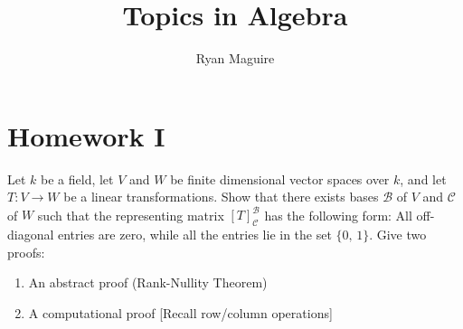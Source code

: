\documentclass[crop=false,class=article]{standalone}                       %
\begin{document}
    \title{Topics in Algebra}
    \author{Ryan Maguire}
    \date{\vspace{-5ex}}
    \maketitle
    \tableofcontents
    \section{Homework I}
        \begin{problem}
            Let $k$ be a field, let $V$ and $W$ be finite dimensional
            vector spaces over $k$, and let $T:V\rightarrow{W}$ be a
            linear transformations. Show that there exists bases
            $\mathscr{B}$ of $V$ and $\mathscr{C}$ of $W$ such that the
            representing matrix $[T]_{\mathscr{C}}^{\mathscr{B}}$ has
            the following form: All off-diagonal entries are zero, while
            all the entries lie in the set $\{0,\,1\}$. Give two proofs:
            \begin{enumerate}
                \item An abstract proof (Rank-Nullity Theorem)
                \item A computational proof [Recall row/column operations]
            \end{enumerate}
        \end{problem}
\end{document}
